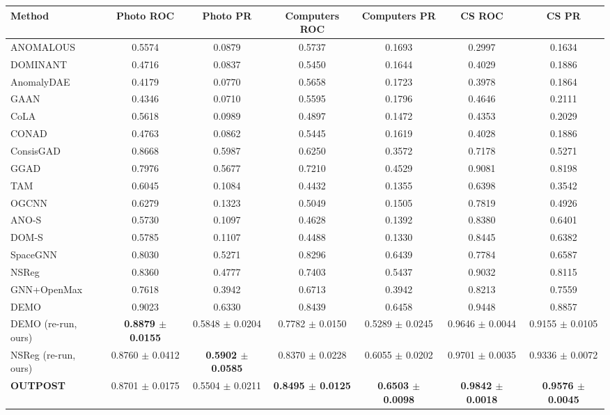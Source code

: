 \begin{table}[t]
\centering
\small
\begin{tabular}{lcccccc}
\toprule
Method & Photo ROC & Photo PR & Computers ROC & Computers PR & CS ROC & CS PR \\
\midrule
ANOMALOUS & 0.5574 & 0.0879 & 0.5737 & 0.1693 & 0.2997 & 0.1634 \\
DOMINANT & 0.4716 & 0.0837 & 0.5450 & 0.1644 & 0.4029 & 0.1886 \\
AnomalyDAE & 0.4179 & 0.0770 & 0.5658 & 0.1723 & 0.3978 & 0.1864 \\
GAAN & 0.4346 & 0.0710 & 0.5595 & 0.1796 & 0.4646 & 0.2111 \\
CoLA & 0.5618 & 0.0989 & 0.4897 & 0.1472 & 0.4353 & 0.2029 \\
CONAD & 0.4763 & 0.0862 & 0.5445 & 0.1619 & 0.4028 & 0.1886 \\
ConsisGAD & 0.8668 & 0.5987 & 0.6250 & 0.3572 & 0.7178 & 0.5271 \\
GGAD & 0.7976 & 0.5677 & 0.7210 & 0.4529 & 0.9081 & 0.8198 \\
TAM & 0.6045 & 0.1084 & 0.4432 & 0.1355 & 0.6398 & 0.3542 \\
OGCNN & 0.6279 & 0.1323 & 0.5049 & 0.1505 & 0.7819 & 0.4926 \\
ANO-S & 0.5730 & 0.1097 & 0.4628 & 0.1392 & 0.8380 & 0.6401 \\
DOM-S & 0.5785 & 0.1107 & 0.4488 & 0.1330 & 0.8445 & 0.6382 \\
SpaceGNN & 0.8030 & 0.5271 & 0.8296 & 0.6439 & 0.7784 & 0.6587 \\
NSReg & 0.8360 & 0.4777 & 0.7403 & 0.5437 & 0.9032 & 0.8115 \\
GNN+OpenMax & 0.7618 & 0.3942 & 0.6713 & 0.3942 & 0.8213 & 0.7559 \\
DEMO & 0.9023 & 0.6330 & 0.8439 & 0.6458 & 0.9448 & 0.8857 \\
DEMO (re-run, ours) & \textbf{0.8879 $\pm$ 0.0155} & 0.5848 $\pm$ 0.0204 & 0.7782 $\pm$ 0.0150 & 0.5289 $\pm$ 0.0245 & 0.9646 $\pm$ 0.0044 & 0.9155 $\pm$ 0.0105 \\
NSReg (re-run, ours) & 0.8760 $\pm$ 0.0412 & \textbf{0.5902 $\pm$ 0.0585} & 0.8370 $\pm$ 0.0228 & 0.6055 $\pm$ 0.0202 & 0.9701 $\pm$ 0.0035 & 0.9336 $\pm$ 0.0072 \\
\midrule
\textbf{OUTPOST} & 0.8701 $\pm$ 0.0175 & 0.5504 $\pm$ 0.0211 & \textbf{0.8495 $\pm$ 0.0125} & \textbf{0.6503 $\pm$ 0.0098} & \textbf{0.9842 $\pm$ 0.0018} & \textbf{0.9576 $\pm$ 0.0045} \\
\bottomrule

\end{tabular}
\end{table}

